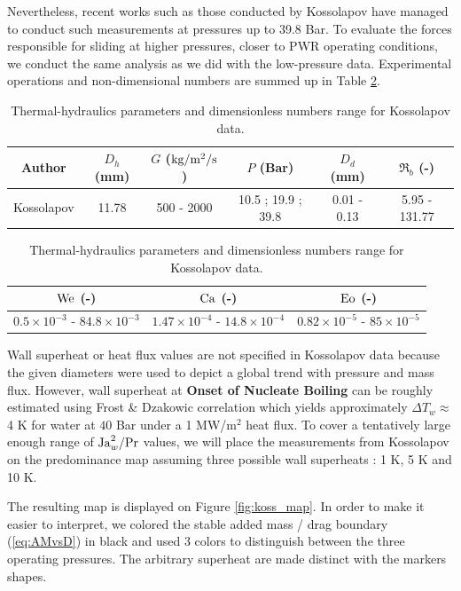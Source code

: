 Nevertheless, recent works such as those conducted by Kossolapov\cite{Kossolapov2021} have managed to conduct such measurements at pressures up to 39.8 Bar. To evaluate the forces responsible for sliding at higher pressures, closer to PWR operating conditions, we conduct the same analysis as we did with the low-pressure data. Experimental operations and non-dimensional numbers are summed up in Table \ref{tab:koss_exp}.

\begin{table}[!htb]
\centering
\caption{Thermal-hydraulics parameters and dimensionless numbers range for Kossolapov data.}
\vspace{14pt}
\begin{tabular}{|c||c|c|c|c||c|} \hline
Author &  $D_{h}$ (mm) & $G$ ($\text{kg/m$^{2}$/s}$) & $P$ (Bar) & $D_{d}$ (mm)  & $\Re_{b}$ (-) \\
\hline
\hline
Kossolapov\cite{Kossolapov2021} & 11.78 & 500 - 2000 & 10.5 ; 19.9 ; 39.8 & 0.01 - 0.13 & 5.95 - 131.77\\
\hline
\end{tabular}
\vspace{14pt}
\begin{tabular}{|c|c|c|}
\hline
$\mathrm{We}$ (-) & $\mathrm{Ca}$ (-) & $\mathrm{Eo}$ (-)\\
\hline
\hline
$0.5\times 10^{-3}$ - $84.8\times 10^{-3}$ & $1.47\times 10^{-4}$ - $14.8\times 10^{-4}$ & $0.82\times 10^{-5}$ - $85\times 10^{-5}$\\
\hline
\end{tabular}
\label{tab:koss_exp}
\end{table}
\vspace{16pt}

Wall superheat or heat flux values are not specified in Kossolapov data because the given diameters were used to depict a global trend with pressure and mass flux. However, wall superheat at \textbf{Onset of Nucleate Boiling} can be roughly estimated using Frost \& Dzakowic correlation\cite{Frost1967} which yields approximately $\Delta T_{w}\approx $
4 K for water at $40$ Bar under a 1 MW/m$^{2}$ heat flux. To cover a tentatively large enough range of $\mathrm{Ja}_{w}^{2}/\mathrm{Pr}$ values, we will place the measurements from Kossolapov on the predominance map assuming three possible wall superheats : 1 K, 5 K and 10 K. 

The resulting map is displayed on Figure \ref{fig:koss_map}. In order to make it easier to interpret, we colored the stable added mass / drag boundary (\ref{eq:AMvsD}) in black and used 3 colors to distinguish between the three operating pressures. The arbitrary superheat are made distinct with the markers shapes.

